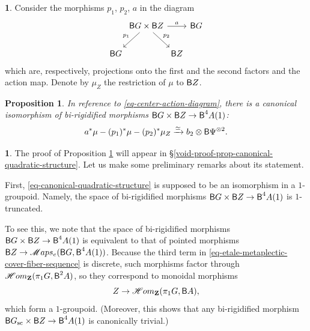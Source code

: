\documentclass[10pt,english,reqno]{amsart}
\newcommand{\integers}{\mathbf Z}
\newcommand{\SMaps}{\mathscr{M}aps}
\newcommand{\SHom}{\mathscr{H}om}
\newcommand{\deloop}{\textnormal{\textsf{B}}}
\newcommand{\sconn}{\textnormal{sc}}
\newtheorem{prop}[subsubsection]{Proposition}
\theoremstyle{definition}
\numberwithin{equation}{section}
\newtheorem{untitledsubsubsection}[subsubsection]{}
\newenvironment{void}
{\begin{untitledsubsubsection}}
{\end{untitledsubsubsection}}
\begin{document}

\begin{void}
\label{void-center-action-morphism}
Consider the morphisms $p_1$, $p_2$, $a$ in the diagram
\begin{equation}
\label{eq-center-action-diagram}
\begin{tikzcd}[column sep = 0em]
& \deloop G \times \deloop Z \ar[rr, "a"]\ar[dl, swap, "p_1"]\ar[dr, "p_2"] & & \deloop G \\
\deloop G & & \deloop Z
\end{tikzcd}
\end{equation}
which are, respectively, projections onto the first and the second factors and the action map. Denote by $\mu_Z$ the restriction of $\mu$ to $\deloop Z$.
\end{void}


\begin{prop}
\label{prop-canonical-quadratic-structure}
In reference to \eqref{eq-center-action-diagram}, there is a canonical isomorphism of bi-rigidified morphisms $\deloop G \times \deloop Z \rightarrow \deloop^4A(1)$:
\begin{equation}
\label{eq-canonical-quadratic-structure}
	a^*\mu - (p_1)^*\mu - (p_2)^*\mu_Z \xrightarrow{\simeq} b_2\otimes \deloop\Psi^{\otimes 2}.
\end{equation}
\end{prop}


\begin{void}
\label{void-bi-rigidified-morphism-one-truncated}
The proof of Proposition \ref{prop-canonical-quadratic-structure} will appear in \S\ref{void-proof-prop-canonical-quadratic-structure}. Let us make some preliminary remarks about its statement.

First, \eqref{eq-canonical-quadratic-structure} is supposed to be an isomorphism in a $1$-groupoid. Namely, the space of bi-rigidified morphisms $\deloop G\times \deloop Z \rightarrow \deloop^4A(1)$ is $1$-truncated.

To see this, we note that the space of bi-rigidified morphisms $\deloop G \times \deloop Z \rightarrow \deloop^4A(1)$ is equivalent to that of pointed morphisms $\deloop Z \rightarrow \SMaps_e(\deloop G, \deloop^4A(1))$. Because the third term in \eqref{eq-etale-metaplectic-cover-fiber-sequence} is discrete, such morphisms factor through $\SHom_{\integers}(\pi_1 G, \deloop^2A)$, so they correspond to monoidal morphisms
$$
Z \rightarrow \SHom_{\integers}(\pi_1G, \deloop A),
$$
which form a $1$-groupoid. (Moreover, this shows that any bi-rigidified morphism $\deloop G_{\sconn} \times \deloop Z \rightarrow \deloop^4A(1)$ is canonically trivial.)
\end{void}
\end{document}
